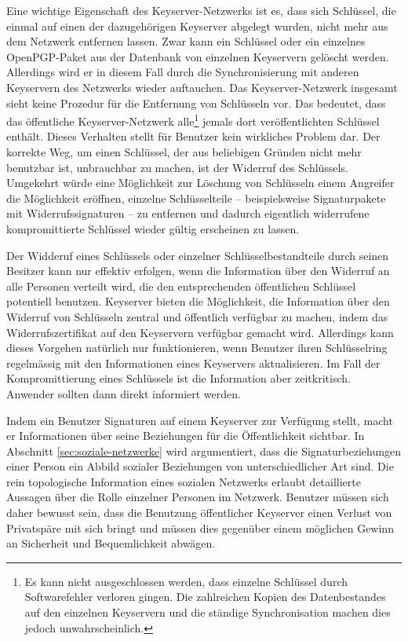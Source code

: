 Eine wichtige Eigenschaft des Keyserver-Netzwerks ist es, dass sich
Schl\"ussel, die einmal auf einen der dazugeh\"origen Keyserver
abgelegt wurden, nicht mehr aus dem Netzwerk entfernen lassen. Zwar
kann ein Schl\"ussel oder ein einzelnes OpenPGP-Paket aus der
Datenbank von einzelnen Keyservern gel\"oscht werden. Allerdings wird
er in diesem Fall durch die Synchronisierung mit anderen Keyservern
des Netzwerks wieder auftauchen. Das Keyserver-Netzwerk insgesamt
sieht keine Prozedur f\"ur die Entfernung von Schl\"usseln vor. Das
bedeutet, dass das \"offentliche Keyserver-Netzwerk alle\footnote{Es
  kann nicht ausgeschlossen werden, dass einzelne Schl\"ussel durch
  Softwarefehler verloren gingen. Die zahlreichen Kopien des
  Datenbestandes auf den einzelnen Keyservern und die st\"andige
  Synchronisation machen dies jedoch unwahrscheinlich.} jemals dort
ver\"offentlichten Schl\"ussel enth\"alt. Dieses Verhalten stellt
f\"ur Benutzer kein wirkliches Problem dar. Der korrekte Weg, um einen
Schl\"ussel, der aus beliebigen Gr\"unden nicht mehr benutzbar ist,
unbrauchbar zu machen, ist der Widerruf des Schl\"ussels. Umgekehrt
w\"urde eine M\"oglichkeit zur L\"oschung von Schl\"usseln einem
Angreifer die M\"oglichkeit er\"offnen, einzelne Schl\"usselteile --
beispielsweise Signaturpakete mit Widerrufssignaturen -- zu entfernen
und dadurch eigentlich widerrufene kompromittierte Schl\"ussel wieder
g\"ultig erscheinen zu lassen.

Der Widderuf eines Schl\"ussels oder einzelner Schl\"usselbestandteile
durch seinen Besitzer kann nur effektiv erfolgen, wenn die Information
\"uber den Widerruf an alle Personen verteilt wird, die den
entsprechenden \"offentlichen Schl\"ussel potentiell
benutzen. Keyserver bieten die M\"oglichkeit, die Information \"uber
den Widerruf von Schl\"usseln zentral und \"offentlich verf\"ugbar zu
machen, indem das Widerrufszertifikat auf den Keyservern verf\"ugbar
gemacht wird. Allerdings kann dieses Vorgehen nat\"urlich nur
funktionieren, wenn Benutzer ihren Schl\"usselring regelm\"assig mit
den Informationen eines Keyservers aktualisieren. Im Fall der
Kompromittierung eines Schl\"ussels ist die Information aber
zeitkritisch. Anwender sollten dann direkt informiert werden.

Indem ein Benutzer Signaturen auf einem Keyserver zur Verf\"ugung
stellt, macht er Informationen \"uber seine Beziehungen f\"ur die
\"Offentlichkeit sichtbar. In Abschnitt \ref{sec:soziale-netzwerke}
wird argumentiert, dass die Signaturbeziehungen einer Person ein
Abbild sozialer Beziehungen von unterschiedlicher Art sind. Die rein
topologische Information eines sozialen Netzwerks erlaubt detaillierte
Aussagen \"uber die Rolle einzelner Personen im
Netzwerk\cite{Carrington2005}. Benutzer m\"ussen sich daher bewusst
sein, dass die Benutzung \"offentlicher Keyserver einen Verlust von
Privatsp\"are mit sich bringt und m\"ussen dies gegen\"uber einem
m\"oglichen Gewinn an Sicherheit und Bequemlichkeit abw\"agen.

